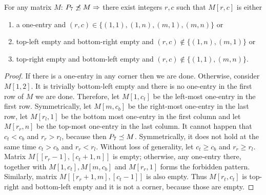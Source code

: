 \begin{lemma}
\label{lemma:p33}
For any matrix $M$: $P_7\not\preceq M\Rightarrow$ there exist integers $r,c$ such that $M[r,c]$ is either
\begin{enumerate}
\item a one-entry and $(r,c)\in\{(1,1),(1,n),(m,1),(m,n)\}$ or
\item top-left empty and bottom-right empty and $(r,c)\not\in\{(1,n),(m,1)\}$ or
\item top-right empty and bottom-left empty and $(r,c)\not\in\{(1,1),(m,n)\}$.
\end{enumerate}
\end{lemma}
\begin{proof}
If there is a one-entry in any corner then we are done. Otherwise, consider $M[1,2]$. It is trivially bottom-left empty and there is no one-entry in the first row of $M$ we are done. Therefore, let $M[1,c_t]$ be the left-most one-entry in the first row. Symmetrically, let $M[m,c_b]$ be the right-most one-entry in the last row, let $M[r_l,1]$ be the bottom most one-entry in the first column and let $M[r_r,n]$ be the top-most one-entry in the last column. It cannot happen that $c_t<c_b$ and $r_r>r_l$, because then $P_7\preceq M$. Symmetrically, it does not hold at the same time $c_t>c_b$ and $r_r<r_l$. Without loss of generality, let $c_t\geq c_b$ and $r_r\geq r_l$. Matrix $M[[r_r-1],[c_t+1,n]]$ is empty; otherwise, any one-entry there, together with $M[1,c_t],M[m,c_b]$ and $M[r_r,1]$ forms the forbidden pattern. Similarly, matrix $M[[r_r+1,m],[c_t-1]]$ is also empty. Thus $M[r_t,c_t]$ is top-right and bottom-left empty and it is not a corner, because those are empty.
\end{proof}

